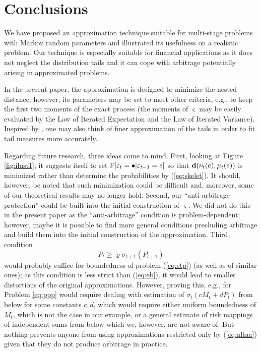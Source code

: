 \documentclass{article}              %
\begin{document}
\section{Conclusions} 
\label{sec:conc}

We have proposed an approximation technique suitable for multi-stage problems with Markov random parameters and illustrated its usefulness on a realistic problem. Our technique is especially suitable  for financial applications as it does not neglect the distribution tails and it can cope with arbitrage potentially arising in approximated problems. 

In the present paper, the approximation is designed to minimize the nested distance; however, its  parameters may be set to meet other criteria, e.g., to keep the first two moments of the exact process (the moments of $\varsigma$ may be easily evaluated by the Law of Iterated Expectation and the Law of Iterated Variance). Inspired by \cite{kozmik2014evaluating}, one may also think of finer approximation of the tails in order to fit tail measures more accurately. 

Regarding future research, three ideas come to mind. First, looking at Figure \ref{fig:ilust1}, it suggests itself to set $\P[\varepsilon_{t}=\bullet|\varepsilon_{t-1}=e]$ so that $\d(\nu_{t}(e),\mu_t(e))$ is minimized rather than determine the probabilities by (\ref{eq:skelet}). It should, however, be noted that such minimization could be difficult and, moreover, some of our theoretical results may no longer hold. Second, our ``anti-arbitrage protection'' could be built into the initial construction of $\varsigma$. We did not do this in the present paper as the ``anti-arbitrage'' condition is problem-dependent; however, maybe it is possible to find more general conditions precluding arbitrage and build them into the initial construction of the approximation. Third, condition 
\begin{equation}\label{eq:altaa}
P_t \geq \varrho \sigma_{t+1}(P_{t+1})
\end{equation}
 would probably suffice for boundedness of problem (\ref{eq:etp}) (as well as of similar ones); as this condition is less strict than (\ref{eq:eb}), it would lead to smaller distortions of the original approximations. However, proving this, e.g., for Problem \ref{eq:ppp} would require dealing with estimation of $\sigma_t(cM_t+dP_t)$ from below for some constants $c,d$, which would require either uniform boundedness of $M_t$, which is not the case in our example, or a general estimate of risk mappings of independent sums from below which we, however, are not aware of. But nothing prevents anyone from using approximations restricted only by (\ref{eq:altaa}) given that they do not produce arbitrage in practice.
 
\end{document}
